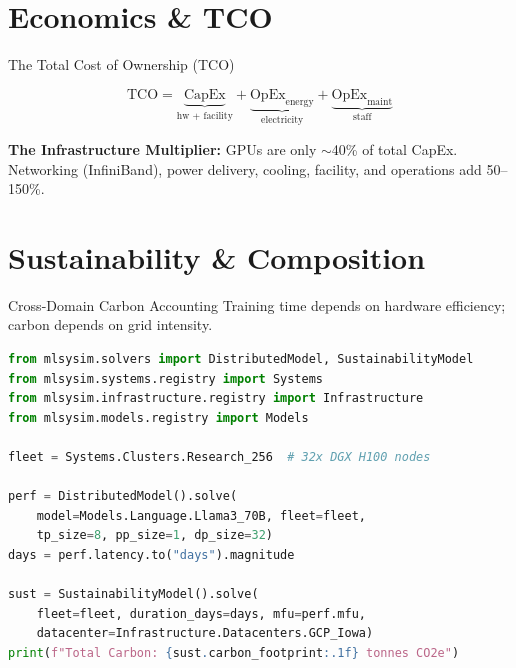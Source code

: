 \documentclass[aspectratio=169, 12pt]{beamer}
\begin{document}
\section{Economics \& TCO}

\begin{frame}{The Total Cost of Ownership (TCO)}
\begin{center}
\Large
\[
\text{TCO} = \underbrace{\text{CapEx}}_{\text{hw + facility}}
          + \underbrace{\text{OpEx}_{\text{energy}}}_{\text{electricity}}
          + \underbrace{\text{OpEx}_{\text{maint}}}_{\text{staff}}
\]
\end{center}
\vspace{1em}
\textbf{The Infrastructure Multiplier:}
GPUs are only $\sim$40\% of total CapEx. Networking (InfiniBand), power delivery, cooling, facility, and operations add 50--150\%.
\end{frame}

\section{Sustainability \& Composition}

\begin{frame}[fragile]{Cross-Domain Carbon Accounting}
\small
Training time depends on hardware efficiency; carbon depends on grid intensity.
\begin{lstlisting}[language=Python,basicstyle=\ttfamily\tiny]
from mlsysim.solvers import DistributedModel, SustainabilityModel
from mlsysim.systems.registry import Systems
from mlsysim.infrastructure.registry import Infrastructure
from mlsysim.models.registry import Models

fleet = Systems.Clusters.Research_256  # 32x DGX H100 nodes

perf = DistributedModel().solve(
    model=Models.Language.Llama3_70B, fleet=fleet,
    tp_size=8, pp_size=1, dp_size=32)
days = perf.latency.to("days").magnitude

sust = SustainabilityModel().solve(
    fleet=fleet, duration_days=days, mfu=perf.mfu,
    datacenter=Infrastructure.Datacenters.GCP_Iowa)
print(f"Total Carbon: {sust.carbon_footprint:.1f} tonnes CO2e")
\end{lstlisting}
\end{frame}
\end{document}
